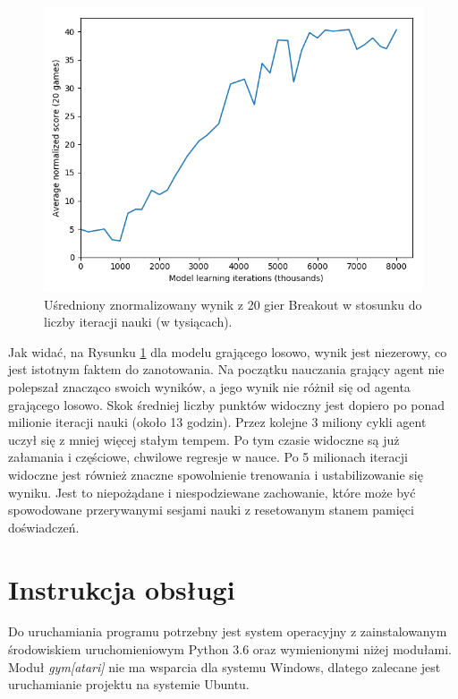 \documentclass[12pt]{article}
\begin{document}
\begin{figure}[H]
\centering \includegraphics[scale=0.7]{20games.png}
\caption{Uśredniony znormalizowany wynik z 20 gier Breakout w stosunku do liczby iteracji nauki (w tysiącach).}
\label{results}
\end{figure}


 Jak widać, na Rysunku \ref{results} dla modelu grającego losowo, wynik jest niezerowy, co jest istotnym faktem do zanotowania. Na początku nauczania grający agent nie polepszał znacząco swoich wyników, a jego wynik nie różnił się od agenta grającego losowo. Skok średniej liczby punktów widoczny jest dopiero po ponad milionie iteracji nauki (około 13 godzin). Przez kolejne 3 miliony cykli agent uczył się z mniej więcej stałym tempem. Po tym czasie widoczne są już załamania i częściowe, chwilowe regresje w nauce. Po 5 milionach iteracji widoczne jest również znaczne spowolnienie trenowania i ustabilizowanie się wyniku. Jest to niepożądane i niespodziewane zachowanie, które może być spowodowane przerywanymi sesjami nauki z resetowanym stanem pamięci doświadczeń.

\section{Instrukcja obsługi}

Do uruchamiania programu potrzebny jest system operacyjny z zainstalowanym środowiskiem uruchomieniowym Python 3.6 oraz wymienionymi niżej modułami. Moduł \textit{gym[atari]} nie ma wsparcia dla systemu Windows, dlatego zalecane jest uruchamianie projektu na systemie Ubuntu. 
\\
\end{document}
